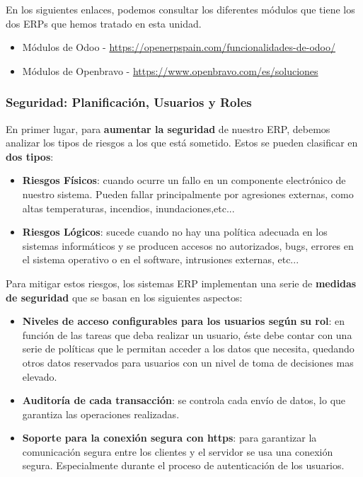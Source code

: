 En los siguientes enlaces, podemos consultar los diferentes módulos que tiene los dos ERPs que hemos tratado en esta unidad.

\begin{itemize}
    \item Módulos de Odoo - \url{https://openerpspain.com/funcionalidades-de-odoo/}
    \item Módulos de Openbravo - \url{https://www.openbravo.com/es/soluciones}
\end{itemize}

\subsubsection{Seguridad: Planificación, Usuarios y Roles}
En primer lugar, para \textbf{aumentar la seguridad} de nuestro ERP, debemos analizar los tipos de riesgos a los que está sometido. Estos se pueden clasificar en \textbf{dos tipos}:

\begin{itemize}
    \item \textbf{Riesgos Físicos}: cuando ocurre un fallo en un componente electrónico de nuestro sistema. Pueden fallar principalmente por agresiones externas, como altas temperaturas, incendios, inundaciones,etc...
    \item \textbf{Riesgos Lógicos}: sucede cuando no hay una política adecuada en los sistemas informáticos y se producen accesos no autorizados, bugs, errores en el sistema operativo o en el software, intrusiones externas, etc...
\end{itemize}

Para mitigar estos riesgos, los sistemas ERP implementan una serie de \textbf{medidas de seguridad} que se basan en los siguientes aspectos:

\begin{itemize}
    \item \textbf{Niveles de acceso configurables para los usuarios según su rol}: en función de las tareas que deba realizar un usuario, éste debe contar con una serie de políticas que le permitan acceder a los datos que necesita, quedando otros datos reservados para usuarios con un nivel de toma de decisiones mas elevado.
    \item \textbf{Auditoría de cada transacción}: se controla cada envío de datos, lo que garantiza las operaciones realizadas.
    \item \textbf{Soporte para la conexión segura con https}: para garantizar la comunicación segura entre los clientes y el servidor se usa una conexión segura. Especialmente durante el proceso de autenticación de los usuarios.
\end{itemize}


